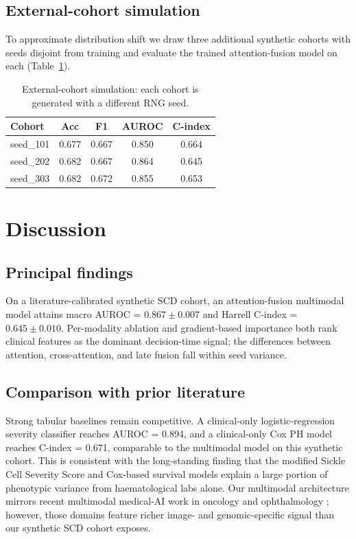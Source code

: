 \documentclass[11pt,a4paper]{article}
\begin{document}
\subsection{External-cohort simulation}
To approximate distribution shift we draw three additional synthetic cohorts with seeds disjoint from training and evaluate the trained attention-fusion model on each (Table~\ref{tab:ext}).
\begin{table}[htbp]\centering
\caption{External-cohort simulation: each cohort is generated with a different RNG seed.}\label{tab:ext}
\small\begin{tabular}{lcccc}
\toprule Cohort & Acc & F1 & AUROC & C-index \\\midrule
seed\_101 & 0.677 & 0.667 & 0.850 & 0.664 \\
seed\_202 & 0.682 & 0.667 & 0.864 & 0.645 \\
seed\_303 & 0.682 & 0.672 & 0.855 & 0.653 \\
\bottomrule\end{tabular}\end{table}
\FloatBarrier
\section{Discussion}
\subsection{Principal findings}
On a literature-calibrated synthetic SCD cohort, an attention-fusion multimodal model attains macro AUROC = $0.867 \pm 0.007$ and Harrell C-index = $0.645 \pm 0.010$. Per-modality ablation and gradient-based importance both rank clinical features as the dominant decision-time signal; the differences between attention, cross-attention, and late fusion fall within seed variance.
\subsection{Comparison with prior literature}
Strong tabular baselines remain competitive. A clinical-only logistic-regression severity classifier reaches AUROC = 0.894, and a clinical-only Cox PH model reaches C-index = 0.671, comparable to the multimodal model on this synthetic cohort. This is consistent with the long-standing finding that the modified Sickle Cell Severity Score \cite{Sebastiani2010} and Cox-based survival models \cite{Quinn2007} explain a large portion of phenotypic variance from haematological labs alone. Our multimodal architecture mirrors recent multimodal medical-AI work in oncology and ophthalmology \cite{Acosta2022,Steyaert2023}; however, those domains feature richer image- and genomic-specific signal than our synthetic SCD cohort exposes.
\end{document}
